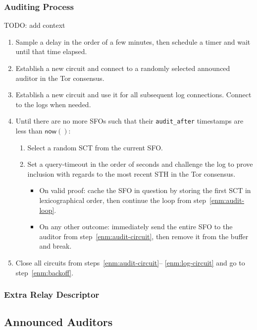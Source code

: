 \subsubsection{Auditing Process}
TODO: add context
\begin{enumerate}
	\item\label{enm:backoff} Sample a delay in the order of a few minutes, then
		schedule a timer and wait until that time elapsed.
	\item\label{enm:audit-circuit} Establish a new circuit and connect to a
		randomly selected announced auditor in the Tor consensus.
	\item\label{enm:log-circuit} Establish a new circuit and use it for all
		subsequent log connections.  Connect to the logs when needed.
	\item\label{enm:audit-loop} Until there are no more SFOs such that their
		\texttt{audit\_after} timestamps are less than $\mathsf{now}()$:
		\begin{enumerate}
			\item Select a random SCT from the current SFO.
			\item Set a query-timeout in the order of seconds and challenge the
				log to prove inclusion with regards to the most recent STH in
				the Tor consensus.
				\begin{itemize}
					\item On valid proof: cache the SFO in question by storing
						the first SCT in lexicographical order, then continue
						the loop from step~\ref{enm:audit-loop}.
					\item On any other outcome: immediately send the entire SFO
						to the auditor from step~\ref{enm:audit-circuit}, then
						remove it from the buffer and break.
				\end{itemize}
		\end{enumerate}
	\item Close all circuits from steps~\ref{enm:audit-circuit}--%
		\ref{enm:log-circuit} and go to step~\ref{enm:backoff}.
\end{enumerate}

\subsubsection{Extra Relay Descriptor}

\subsection{Announced Auditors}
